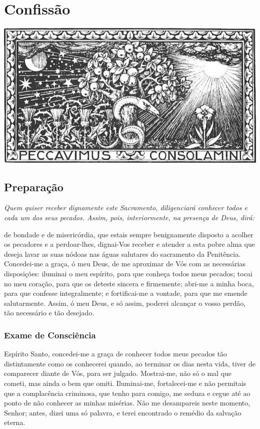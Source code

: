 \section{Confissão}

\begin{nscenter}
\includegraphics[width=1\textwidth,height=1\textheight,keepaspectratio]{media/pecado}
\end{nscenter}

\subsection{Preparação}

\emph{Quem quiser receber dignamente este Sacramento, diligenciará conhecer todos e cada um dos seus pecados. Assim, pois, interiormente, na presença de Deus, dirá:}

 de bondade e de misericórdia, que estais sempre benignamente disposto a acolher os pecadores e a perdoar-lhes, dignai-Vos receber e atender a esta pobre alma que deseja lavar as suas nódoas nas águas salutares do sacramento da Penitência. Concedei-me a graça, ó meu Deus, de me aproximar de Vós com as necessárias disposições: iluminai o meu espírito, para que conheça todos meus pecados; tocai no meu coração,
para que os deteste sincera e firmemente; abri-me a minha boca, para que confesse integralmente; e fortificai-me a vontade, para que me emende salutarmente. Assim, ó meu Deus, e só assim, poderei alcançar o vosso perdão, tão necessário e tão desejado.

\subsubsection{Exame de Consciência}

 Espírito Santo, concedei-me a graça de conhecer todos meus pecados tão distintamente como os conhecerei quando, ao terminar os dias nesta vida, tiver de comparecer diante de Vós, para ser julgado. Mostrai-me, não só o mal que cometi, mas ainda o bem que omiti. Iluminai-me, fortalecei-me e não permitais que a complacência criminosa, que tenho para comigo, me seduza e cegue até ao ponto de não conhecer as minhas misérias. Não me desampareis neste momento, Senhor; antes, dizei uma só palavra, e terei encontrado o remédio da salvação eterna.

